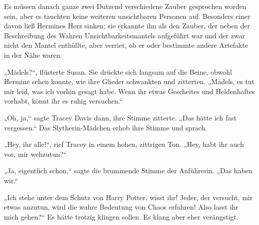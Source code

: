 Es müssen danach ganze zwei Dutzend verschiedene Zauber gesprochen worden sein, aber es tauchten keine weiteren unsichtbaren Personen auf. Besonders einer davon ließ Hermines Herz sinken; sie erkannte ihn als den Zauber, der neben der Beschreibung des Wahren Unsichtbarkeitsmantels aufgeführt war und der zwar nicht den Mantel enthüllte, aber verriet, ob er oder bestimmte andere Artefakte in der Nähe waren.

„Mädels?“, flüsterte Susan. Sie drückte sich langsam auf die Beine, obwohl Hermine sehen konnte, wie ihre Glieder schwankten und zitterten. „Mädels, es tut mir leid, was ich vorhin gesagt habe. Wenn ihr etwas Gescheites und Heldenhaftes vorhabt, könnt ihr es ruhig versuchen.“

„Oh, ja,“ sagte Tracey Davis dann, ihre Stimme zitterte. „Das hätte ich fast vergessen.“ Das Slytherin-Mädchen erhob ihre Stimme und sprach.

„Hey, ihr alle!“, rief Tracey in einem hohen, zittrigen Ton. „Hey, habt ihr auch vor, mir wehzutun?“

„Ja, eigentlich schon,“ sagte die brummende Stimme der Anführerin. „Das haben wir.“

„Ich stehe unter dem Schutz von Harry Potter, wisst ihr! Jeder, der versucht, mir etwas anzutun, wird die wahre Bedeutung von Chaos erfahren! Also lasst ihr mich gehen?“ Es hätte trotzig klingen sollen. Es klang aber eher verängstigt.

